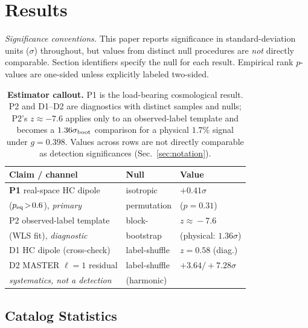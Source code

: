 \documentclass[aps,prd,twocolumn,superscriptaddress,preprintnumbers,nofootinbib,longbibliography,floatfix]{revtex4-2}
\newcommand{\sigmaunit}{\sigma}
\begin{document}
\section{Results}
\label{sec:results}

\textit{Significance conventions.} This paper reports significance in standard-deviation units ($\sigma$) throughout, but values from distinct null procedures are \emph{not} directly comparable. Section identifiers specify the null for each result. Empirical rank $p$-values are one-sided unless explicitly labeled two-sided.

\begin{table}[t]
\caption{\textbf{Estimator callout.} P1 is the load-bearing cosmological result. P2 and D1--D2 are diagnostics with distinct samples and nulls; P2's $z\approx-7.6$ applies only to an observed-label template and becomes a $1.36\sigma_{\rm boot}$ comparison for a physical $1.7\%$ signal under $g=0.398$. Values across rows are not directly comparable as detection significances (Sec.~\ref{sec:notation}).\label{tab:primary_callout}}
\begin{ruledtabular}
\scriptsize
\begin{tabular}{lll}
\textbf{Claim / channel} & \textbf{Null} & \textbf{Value} \\
\hline
\textbf{P1} real-space HC dipole & isotropic & $+0.41\sigmaunit$ \\
\quad ($p_{\rm eq}\!>\!0.6$), \emph{primary} & \quad permutation & \quad ($p\!=\!0.31$) \\
P2 observed-label template & block- & $z\!\approx\!-7.6$ \\
\quad (WLS fit), \emph{diagnostic} & \quad bootstrap & \quad (physical: $1.36\sigma$) \\
\hline
D1 HC dipole (cross-check) & label-shuffle & $z\!=\!0.58$ (diag.) \\
D2 MASTER $\ell\!=\!1$ residual & label-shuffle & $+3.64/+7.28\sigmaunit$ \\
\quad \emph{systematics, not a detection} & \quad (harmonic) & \\
\end{tabular}
\end{ruledtabular}
\end{table}

\subsection{Catalog Statistics}
\label{sec:stats}
\end{document}
